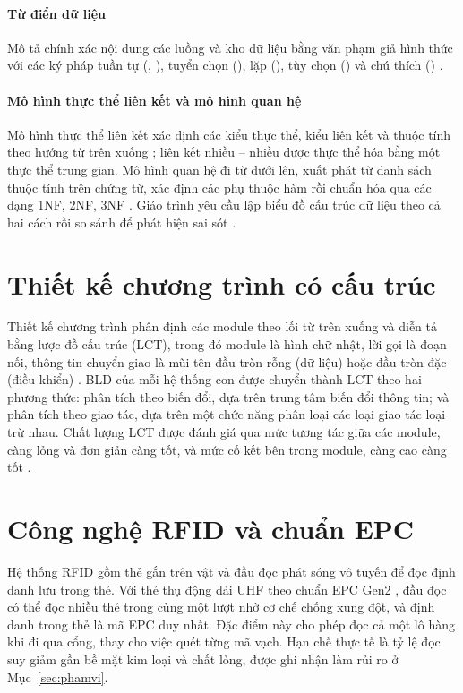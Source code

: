 \paragraph{Từ điển dữ liệu} Mô tả chính xác nội dung các luồng và kho dữ liệu bằng văn phạm giả hình thức với các ký pháp tuần tự (\code{=}, \code{+}), tuyển chọn (\code{[ | ]}), lặp (), tùy chọn (\code{( )}) và chú thích (\code{* *}) \cite[Ch.~3]{tung_qlhttt}.

\paragraph{Mô hình thực thể liên kết và mô hình quan hệ} Mô hình thực thể liên kết xác định các kiểu thực thể, kiểu liên kết và thuộc tính theo hướng từ trên xuống \cite{chen1976}; liên kết nhiều -- nhiều được thực thể hóa bằng một thực thể trung gian. Mô hình quan hệ đi từ dưới lên, xuất phát từ danh sách thuộc tính trên chứng từ, xác định các phụ thuộc hàm rồi chuẩn hóa qua các dạng 1NF, 2NF, 3NF \cite{codd1970}. Giáo trình yêu cầu lập biểu đồ cấu trúc dữ liệu theo cả hai cách rồi so sánh để phát hiện sai sót \cite[Ch.~6]{tung_qlhttt}.

\section{Thiết kế chương trình có cấu trúc}
\label{sec:lct}

Thiết kế chương trình phân định các module theo lối từ trên xuống và diễn tả bằng lược đồ cấu trúc (LCT), trong đó module là hình chữ nhật, lời gọi là đoạn nối, thông tin chuyển giao là mũi tên đầu tròn rỗng (dữ liệu) hoặc đầu tròn đặc (điều khiển) \cite[Ch.~10]{tung_qlhttt}. BLD của mỗi hệ thống con được chuyển thành LCT theo hai phương thức: phân tích theo biến đổi, dựa trên trung tâm biến đổi thông tin; và phân tích theo giao tác, dựa trên một chức năng phân loại các loại giao tác loại trừ nhau. Chất lượng LCT được đánh giá qua mức tương tác giữa các module, càng lỏng và đơn giản càng tốt, và mức cố kết bên trong module, càng cao càng tốt \cite{yourdon1979}.

\section{Công nghệ RFID và chuẩn EPC}
\label{sec:rfid}

Hệ thống RFID gồm thẻ gắn trên vật và đầu đọc phát sóng vô tuyến để đọc định danh lưu trong thẻ. Với thẻ thụ động dải UHF theo chuẩn EPC Gen2 \cite{epcgen2}, đầu đọc có thể đọc nhiều thẻ trong cùng một lượt nhờ cơ chế chống xung đột, và định danh trong thẻ là mã EPC duy nhất. Đặc điểm này cho phép đọc cả một lô hàng khi đi qua cổng, thay cho việc quét từng mã vạch. Hạn chế thực tế là tỷ lệ đọc suy giảm gần bề mặt kim loại và chất lỏng, được ghi nhận làm rủi ro ở Mục~\ref{sec:phamvi}.

